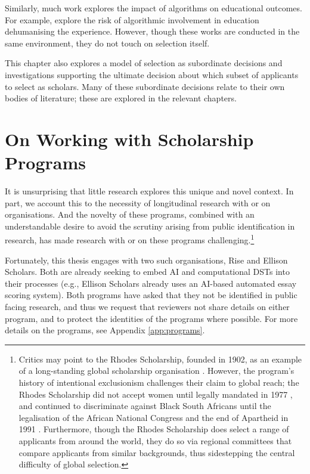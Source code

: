 Similarly, much work explores the impact of algorithms on educational outcomes. For example, \textcite{NISSENBAUM1998237} explore the risk of algorithmic involvement in education dehumanising the experience. However, though these works are conducted in the same environment, they do not touch on selection itself.

This chapter also explores a model of selection as subordinate decisions and investigations supporting the ultimate decision about which subset of applicants to select as scholars. Many of these subordinate decisions relate to their own bodies of literature; these are explored in the relevant chapters.

\section{On Working with Scholarship Programs}
It is unsurprising that little research explores this unique and novel context. In part, we account this to the necessity of longitudinal research with or on organisations. And the novelty of these programs, combined with an understandable desire to avoid the scrutiny arising from public identification in research, has made research with or on these programs challenging.\footnote{Critics may point to the Rhodes Scholarship, founded in 1902, as an example of a long-standing global scholarship organisation \cite{Ziegler_2008}. However, the program's history of intentional exclusionism challenges their claim to global reach; the Rhodes Scholarship did not accept women until legally mandated in 1977 \cite{Ziegler_2008}, and continued to discriminate against Black South Africans until the legalisation of the African National Congress and the end of Apartheid in 1991 \cite{Ziegler_2008}. Furthermore, though the Rhodes Scholarship does select a range of applicants from around the world, they do so via regional committees that compare applicants from similar backgrounds, thus sidestepping the central difficulty of global selection.}

Fortunately, this thesis engages with two such organisations, Rise and Ellison Scholars. Both are already seeking to embed AI and computational DSTs into their processes (e.g., Ellison Scholars already uses an AI-based automated essay scoring system). Both programs have asked that they not be identified in public facing research, and thus we request that reviewers not share details on either program, and to protect the identities of the programs where possible. For more details on the programs, see Appendix \ref{app:programs}.


